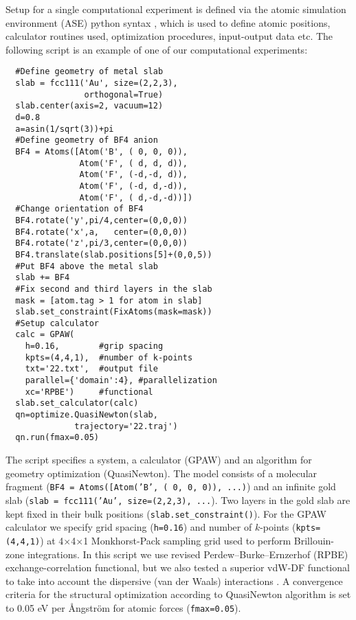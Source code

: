 \documentclass[a4paper,10pt]{article}
\begin{document}
Setup for a single computational experiment is defined via the atomic simulation environment (ASE) python syntax \cite{ase}, which is used to define atomic positions, calculator routines used, optimization procedures, input-output data etc. The following script is an example of one of our computational experiments:

\begin{lstlisting}
  #Define geometry of metal slab
  slab = fcc111('Au', size=(2,2,3),
                orthogonal=True)
  slab.center(axis=2, vacuum=12)
  d=0.8
  a=asin(1/sqrt(3))+pi
  #Define geometry of BF4 anion
  BF4 = Atoms([Atom('B', ( 0, 0, 0)),
               Atom('F', ( d, d, d)),
               Atom('F', (-d,-d, d)),
               Atom('F', (-d, d,-d)),
               Atom('F', ( d,-d,-d))])
  #Change orientation of BF4
  BF4.rotate('y',pi/4,center=(0,0,0))
  BF4.rotate('x',a,   center=(0,0,0))
  BF4.rotate('z',pi/3,center=(0,0,0))
  BF4.translate(slab.positions[5]+(0,0,5))
  #Put BF4 above the metal slab
  slab += BF4
  #Fix second and third layers in the slab
  mask = [atom.tag > 1 for atom in slab]
  slab.set_constraint(FixAtoms(mask=mask))
  #Setup calculator
  calc = GPAW(
    h=0.16,        #grip spacing
    kpts=(4,4,1),  #number of k-points
    txt='22.txt',  #output file
    parallel={'domain':4}, #parallelization
    xc='RPBE')     #functional
  slab.set_calculator(calc)
  qn=optimize.QuasiNewton(slab,
              trajectory='22.traj')
  qn.run(fmax=0.05)
\end{lstlisting}

The script specifies a system, a calculator (GPAW) and an algorithm for geometry optimization (QuasiNewton). The model consists of a molecular fragment (\texttt{BF4 = Atoms([Atom('B', ( 0, 0, 0)), ...)}) and an infinite gold slab (\texttt{slab = fcc111('Au', size=(2,2,3), ...}). Two layers in the gold slab are kept fixed in their bulk positions (\texttt{slab.set\_constraint()}). For the GPAW calculator we specify grid spacing (\texttt{h=0.16}) and number of $k$-points (\texttt{kpts=(4,4,1)}) at 4$\times$4$\times$1 Monkhorst-Pack sampling grid used to perform Brillouin-zone integrations. In this script we use revised Perdew--Burke--Ernzerhof (RPBE) exchange-correlation functional, but we also tested a superior vdW-DF functional to take into account the dispersive (van der Waals) interactions \cite{ivanistsev2012}. A convergence criteria for the structural optimization according to QuasiNewton algorithm is set to 0.05 eV per \r{A}ngstr\"{o}m for atomic forces (\texttt{fmax=0.05}). 
\end{document}
